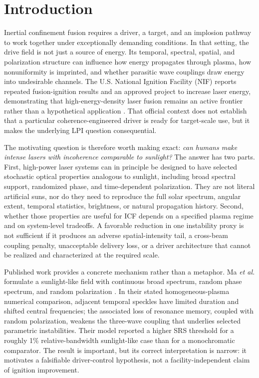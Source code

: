 \documentclass[conference]{../../../../Conference-LaTeX-template_10-17-19/IEEEtran}
\begin{document}
\section{Introduction}
Inertial confinement fusion requires a driver, a target, and an implosion pathway to work together under exceptionally demanding conditions. In that setting, the drive field is not just a source of energy. Its temporal, spectral, spatial, and polarization structure can influence how energy propagates through plasma, how nonuniformity is imprinted, and whether parasitic wave couplings draw energy into undesirable channels. The U.S. National Ignition Facility (NIF) reports repeated fusion-ignition results and an approved project to increase laser energy, demonstrating that high-energy-density laser fusion remains an active frontier rather than a hypothetical application \cite{nif_2026}. That official context does not establish that a particular coherence-engineered driver is ready for target-scale use, but it makes the underlying LPI question consequential.

The motivating question is therefore worth making exact: \emph{can humans make intense lasers with incoherence comparable to sunlight?} The answer has two parts. First, high-power laser systems can in principle be designed to have selected stochastic optical properties analogous to sunlight, including broad spectral support, randomized phase, and time-dependent polarization. They are not literal artificial suns, nor do they need to reproduce the full solar spectrum, angular extent, temporal statistics, brightness, or natural propagation history. Second, whether those properties are useful for ICF depends on a specified plasma regime and on system-level tradeoffs. A favorable reduction in one instability proxy is not sufficient if it produces an adverse spatial-intensity tail, a cross-beam coupling penalty, unacceptable delivery loss, or a driver architecture that cannot be realized and characterized at the required scale.

Published work provides a concrete mechanism rather than a metaphor. Ma \emph{et al.} formulate a sunlight-like field with continuous broad spectrum, random phase spectrum, and random polarization \cite{ma2021}. In their stated homogeneous-plasma numerical comparison, adjacent temporal speckles have limited duration and shifted central frequencies; the associated loss of resonance memory, coupled with random polarization, weakens the three-wave coupling that underlies selected parametric instabilities. Their model reported a higher SRS threshold for a roughly 1\% relative-bandwidth sunlight-like case than for a monochromatic comparator. The result is important, but its correct interpretation is narrow: it motivates a falsifiable driver-control hypothesis, not a facility-independent claim of ignition improvement.
\end{document}
